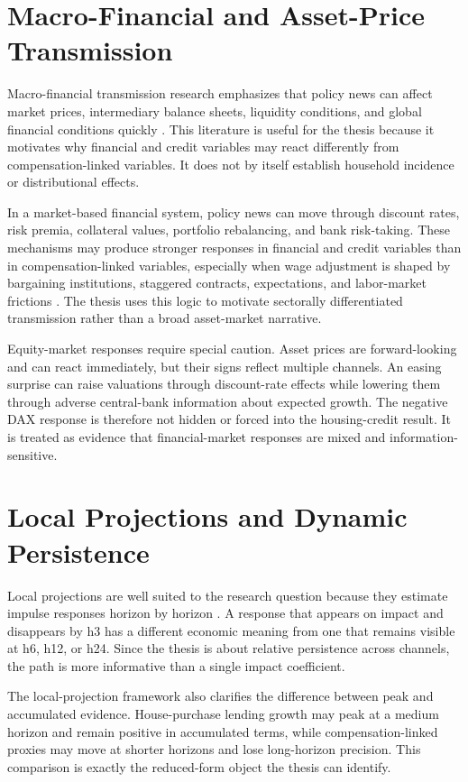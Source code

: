 \section{Macro-Financial and Asset-Price Transmission}

Macro-financial transmission research emphasizes that policy news can affect market prices, intermediary balance sheets, liquidity conditions, and global financial conditions quickly \parencite{AdrianShin2010,BorioZhu2012,Rey2015}. This literature is useful for the thesis because it motivates why financial and credit variables may react differently from compensation-linked variables. It does not by itself establish household incidence or distributional effects.

In a market-based financial system, policy news can move through discount rates, risk premia, collateral values, portfolio rebalancing, and bank risk-taking. These mechanisms may produce stronger responses in financial and credit variables than in compensation-linked variables, especially when wage adjustment is shaped by bargaining institutions, staggered contracts, expectations, and labor-market frictions \parencite{Taylor1980}. The thesis uses this logic to motivate sectorally differentiated transmission rather than a broad asset-market narrative.

Equity-market responses require special caution. Asset prices are forward-looking and can react immediately, but their signs reflect multiple channels. An easing surprise can raise valuations through discount-rate effects while lowering them through adverse central-bank information about expected growth. The negative DAX response is therefore not hidden or forced into the housing-credit result. It is treated as evidence that financial-market responses are mixed and information-sensitive.

\section{Local Projections and Dynamic Persistence}

Local projections are well suited to the research question because they estimate impulse responses horizon by horizon \parencite{Jorda2005}. A response that appears on impact and disappears by h3 has a different economic meaning from one that remains visible at h6, h12, or h24. Since the thesis is about relative persistence across channels, the path is more informative than a single impact coefficient.

The local-projection framework also clarifies the difference between peak and accumulated evidence. House-purchase lending growth may peak at a medium horizon and remain positive in accumulated terms, while compensation-linked proxies may move at shorter horizons and lose long-horizon precision. This comparison is exactly the reduced-form object the thesis can identify.

